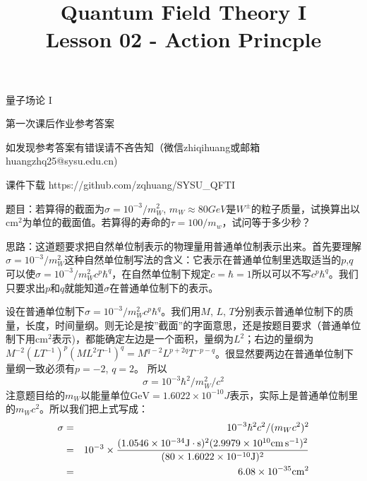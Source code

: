 \documentclass[CJK]{beamer}
\title{Quantum Field Theory I \\ Lesson 02 - Action Princple}
\author{}
\date{}
\begin{document}
\begin{frame}
 
\begin{center}
\begin{Large}
\bch
量子场论 I 

{\vskip 0.3in}

第一次课后作业参考答案
\skipline
\skipline

如发现参考答案有错误请不吝告知（微信zhiqihuang或邮箱huangzhq25@sysu.edu.cn)
\ech
\end{Large}
\end{center}

\vskip 0.2in

\bch
课件下载
\ech
https://github.com/zqhuang/SYSU\_QFTI

\end{frame}

\begin{frame}
\bch
题目：若算得的截面为$\sigma = 10^{-3}/m_W^2$, $m_W \approx 80 GeV$是$W^{\pm}$的粒子质量，试换算出以$\mathrm{cm}^2$为单位的截面值。若算得的寿命的$\tau = 100/m_w$，试问等于多少秒？

\skipline
思路：这道题要求把自然单位制表示的物理量用普通单位制表示出来。首先要理解$\sigma = 10^{-3}/m_W^2$这种自然单位制写法的含义：它表示在普通单位制里选取适当的$p$,$q$可以使$\sigma = 10^{-3}/m_W^2 c^p\hbar^q$，在自然单位制下规定$c=\hbar=1$所以可以不写$c^p\hbar^q$。我们只要求出$p$和$q$就能知道$\sigma$在普通单位制下的表示。

\ech
\end{frame}

\begin{frame}
\bch
设在普通单位制下$\sigma = 10^{-3}/m_W^2 c^p \hbar^q$。我们用$M$, $L$, $T$分别表示普通单位制下的质量，长度，时间量纲。则无论是按”截面”的字面意思，还是按题目要求（普通单位制下用$\mathrm{cm}^2$表示)，都能确定左边是一个面积，量纲为$L^2$；右边的量纲为$M^{-2} (LT^{-1})^p(ML^2T^{-1})^q = M^{q-2}L^{p+2q}T^{-p-q}$。很显然要两边在普通单位制下量纲一致必须有$p=-2$, $q=2$。 所以
$$\sigma = 10^{-3}\hbar^2 /m_W^2/c^2$$
注意题目给的$m_W$以能量单位$\mathrm{GeV}=1.6022\times 10^{-10}J$表示，实际上是普通单位制里的$m_Wc^2$。所以我们把上式写成：
\begin{eqnarray}
\sigma &=& 10^{-3}\hbar^2 c^2/(m_Wc^2)^2 \nonumber \\
       &=& 10^{-3}\times \frac{(1.0546 \times 10^{-34} \mathrm{J\cdot s})^2(2.9979\times10^{10}\mathrm{cm}\,\mathrm{s}^{-1})^2}{(80\times 1.6022 \times 10^{-10} \mathrm{J})^2} \nonumber \\
       &=& 6.08\times 10^{-35} \mathrm{cm}^2 \nonumber
\end{eqnarray}
\ech
\end{frame}
\end{document}
